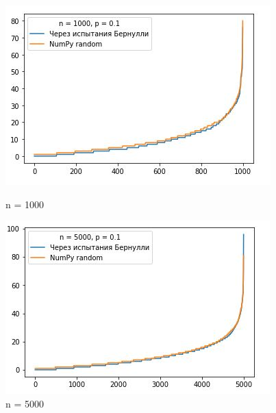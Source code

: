 \documentclass[a4paper,12pt, oneside]{book}
\begin{document}
{{\begin{figure}[h]
	\begin{center}
		\begin{minipage}[h]{0.4\linewidth}
			\includegraphics[width=1\linewidth]{py_1_1000.jpg}
			\caption{n = 1000} %
			\label{ris:experimoriginal} %
		\end{minipage}
		\hfill
		\begin{minipage}[h]{0.4\linewidth}
			\includegraphics[width=1\linewidth]{py_1_5000.jpg}
			\caption{n = 5000}
			\label{ris:experimcoded}
		\end{minipage}
	\end{center}
\end{figure} 



}}
\end{document}
